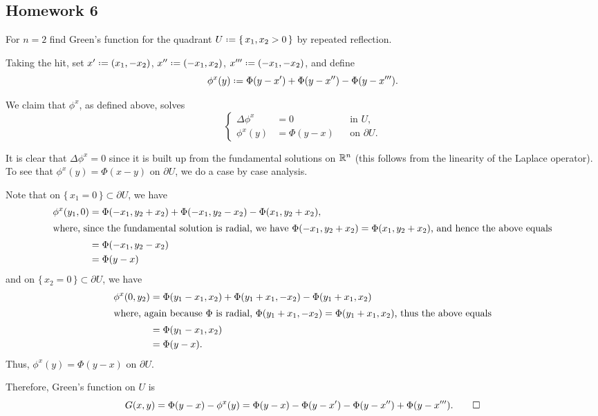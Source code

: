 \subsection{Homework 6}
\begin{problem}
  For \(n=2\) find Green's function for the quadrant
  \(U\defeq\{\,x_1,x_2>0\,\}\) by repeated reflection.
\end{problem}
\begin{solution*}
  Taking the hit, set \(x'\defeq(x_1,-x_2)\), \(x''\defeq(-x_1,x_2)\),
  \(x'''\defeq(-x_1,-x_2)\), and define
  \begin{equation}
    \label{eq:6:corrector}
    \phi^x(y)\defeq\Phi(y-x')+\Phi(y-x'')-\Phi(y-x''').
  \end{equation}

  We claim that \(\phi^x\), as defined above, solves
  \[
    \left\{
      \begin{aligned}
        \Delta\phi^x&=0&&\text{in \(U\),}\\
        \phi^x(y)&=\Phi(y-x)&&\text{on \(\partial U\).}
      \end{aligned}
    \right.
  \]

  It is clear that \(\Delta\phi^x=0\) since it is built up from the
  fundamental solutions on \(\mathbb{R}^n\) (this follows from the linearity of
  the Laplace operator). To see that \(\phi^x(y)=\Phi(x-y)\) on
  \(\partial U\), we do a case by case analysis.

  Note that on \(\{\,x_1=0\,\}\subset\partial U\), we have
  \begin{align*}
    \phi^x(y_1,0)
    &=\Phi(-x_1,y_2+x_2)+\Phi(-x_1,y_2-x_2)-\Phi(x_1,y_2+x_2),\\
    \intertext{where, since the fundamental solution is radial, we have
    \(\Phi(-x_1,y_2+x_2)=\Phi(x_1,y_2+x_2)\), and hence the above equals}
    &=\Phi(-x_1,y_2-x_2)\\
    &=\Phi(y-x)
  \end{align*}
  and on \(\{\,x_2=0\,\}\subset\partial U\), we have
  \begin{align*}
    \phi^x(0,y_2)
    &=\Phi(y_1-x_1,x_2)+\Phi(y_1+x_1,-x_2)-\Phi(y_1+x_1,x_2)\\
    \intertext{where, again because \(\Phi\) is radial,
    \(\Phi(y_1+x_1,-x_2)=\Phi(y_1+x_1,x_2)\), thus the above equals}
    &=\Phi(y_1-x_1,x_2)\\
    &=\Phi(y-x).
  \end{align*}
  Thus, \(\phi^x(y)=\Phi(y-x)\) on \(\partial U\).

  Therefore, Green's function on \(U\) is
  \[
    G(x,y)
    =\Phi(y-x)-\phi^x(y)%
    =\Phi(y-x)-\Phi(y-x')-\Phi(y-x'')+\Phi(y-x''').%
    \qedhere
  \]
\end{solution*}

